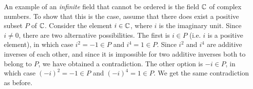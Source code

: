 \documentclass[11pt,twoside=off,numbers=noenddot]{scrbook}
\begin{document}
An example of an \textit{infinite} field that cannot be ordered is
the field $\mathbb C$ of complex numbers. To show that this is the case,
assume that there does exist a positive subset $P$ of $\mathbb C$. Consider
the element $i \in \mathbb C$, where $i$ is the imaginary unit. Since $i \neq
0$, there are two alternative possibilities. The first is $i \in P$
(i.e. $i$ is a positive element), in which case $i^2 = -1 \in P$ and
$i^4 = 1 \in P$. Since $i^2$ and $i^4$ are additive inverses of each
other, and since it is impossible for two additive inverses both to
belong to $P$, we have obtained a contradiction. The other option is
$-i \in P$, in which case $(-i)^2 = -1 \in P$ and $(-i)^4 = 1 \in P$.
We get the same contradiction as before.

\printbibliography[nottype=image]
\end{document}
